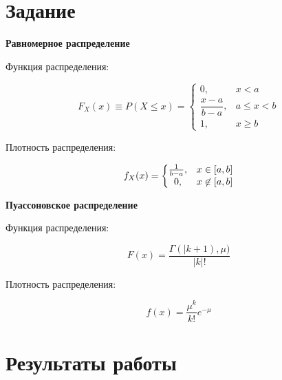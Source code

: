 \documentclass[14pt, a4paper]{extarticle}
\begin{document}
	
	\section{Задание}
	
	\textbf{Равномерное распределение }
		
	Функция распределения:
	
	\begin{equation*}
		F_X(x) \equiv P(X \le x) = \left\{
		\begin{matrix}
			0, & x < a \\
			\dfrac{x-a}{b-a}, & a \le x < b \\
			1, & x \ge b
		\end{matrix}
		\right.
	\end{equation*}

	Плотность распределения:
	
	\begin{equation*}
		f_X(x) = \left\{
		\begin{matrix}
			{1 \over b-a}, & x\in [a,b] \\
			0, & x\not\in [a,b]
		\end{matrix}
		\right.
	\end{equation*}
	
	
	\textbf{Пуассоновское распределение}
	
	Функция распределения:
	
	\begin{equation*}
		F(x) =  \frac{\Gamma(|k + 1), \mu)}{|k|!}
	\end{equation*}

	Плотность распределения:
	
	\begin{equation*}
		f(x) = \frac{\mu^{k}}{k!} e^{-\mu} 
	\end{equation*}	
	\newpage
	
	\section{Результаты работы}
	
\end{document}
